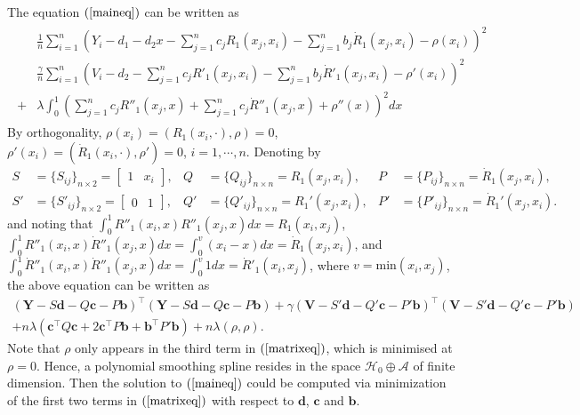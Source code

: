 The equation $(\ref{maineq})$ can be written as
\begin{align*}
\begin{split}
&\frac{1}{n}\sum_{i=1}^n \left( Y_i - d_1-d_2x-\sum_{j=1}^{n}c_jR_1(x_j,x_i)-\sum_{j=1}^{n}b_j\dot{R}_1(x_j,x_i)-\rho(x_i) \right) ^2\\
&\frac{\gamma}{n}\sum_{i=1}^n \left( V_i - d_2-\sum_{j=1}^{n}c_jR'_1(x_j,x_i)-\sum_{j=1}^{n}b_j\dot{R}'_1(x_j,x_i)-\rho'(x_i) \right) ^2\\
+&\lambda \int_0^1 \left( \sum_{j=1}^{n}c_jR''_1(x_j,x)+\sum_{j=1}^{n}c_j\dot{R}''_1(x_j,x)+\rho''(x)\right)^2dx
\end{split}
\end{align*}
By orthogonality, $\rho(x_i) = (R_1(x_i,\cdot),\rho)=0$, $\rho'(x_i) = (\dot{R}_1(x_i,\cdot),\rho')=0$, $i=1,\cdots,n$. Denoting by
\begin{align*}
S&=\{S_{ij} \}_{n\times 2}=\begin{bmatrix}1 & x_i \end{bmatrix} ,& Q&=\{Q_{ij} \}_{n\times n}= R_1(x_j,x_i), & P&=\{P_{ij} \}_{n\times n}= \dot{R}_1(x_j,x_i), \\
S'&=\{S'_{ij} \}_{n\times 2}=\begin{bmatrix} 0 & 1 \end{bmatrix} ,& Q'&=\{Q'_{ij} \}_{n\times n}= R_1'(x_j,x_i), & P'&=\{P'_{ij} \}_{n\times n}= \dot{R}_1'(x_j,x_i). 
\end{align*}
and noting that $\int_0^1R''_1(x_i,x)R''_1(x_j,x)dx=R_1(x_i,x_j)$, $\int_0^1R''_1(x_i,x)\dot{R}''_1(x_j,x)dx=\int_0^{v}(x_i-x)dx=\dot{R}_1(x_j,x_i)$, and $\int_0^1\dot{R}''_1(x_i,x)\dot{R}''_1(x_j,x)dx=\int_0^{v}1dx=\dot{R}'_1(x_i,x_j)$, where $v=\mbox{min}(x_i,x_j)$, the above equation can be written as
\begin{equation}\label{matrixeq}
\begin{split}
(\mathbf{Y}-S\mathbf{d}-Q\mathbf{c}-P\mathbf{b})^\top (\mathbf{Y}-S\mathbf{d}-Q\mathbf{c}-P\mathbf{b})+
\gamma(\mathbf{V}-S'\mathbf{d}-Q'\mathbf{c}-P'\mathbf{b})^\top (\mathbf{V}-S'\mathbf{d}-Q'\mathbf{c}-P'\mathbf{b})\\
+n\lambda (\mathbf{c}^\top Q\mathbf{c} + 2\mathbf{c}^\top P\mathbf{b}+ \mathbf{b}^\top P'\mathbf{b})+n\lambda(\rho,\rho).
\end{split}
\end{equation}
Note that $\rho$ only appears in the third term in $(\ref{matrixeq})$, which is minimised at $\rho=0$. Hence, a polynomial smoothing spline resides in the space $\mathcal{H}_0\oplus \mathcal{A}$ of finite dimension. Then the solution to $(\ref{maineq})$ could be computed via minimization of the first two terms in $(\ref{matrixeq})$ with respect to $\mathbf{d}$, $\mathbf{c}$ and $\mathbf{b}$.

